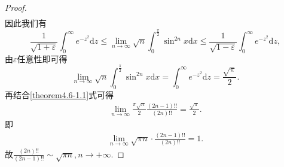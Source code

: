 \documentclass[../../main.tex]{subfiles}
\begin{document}
\begin{proof}
\begin{align*}
\end{align*}
因此我们有
\[
\frac{1}{\sqrt{1 + \varepsilon}}\int_{0}^{\infty}e^{-z^{2}}\mathrm{d}z\leqslant\lim_{n\rightarrow\infty}\sqrt{n}\int_{0}^{\frac{\pi}{2}}\sin^{2n}x \mathrm{d}x\leqslant\frac{1}{\sqrt{1 - \varepsilon}}\int_{0}^{\infty}e^{-z^{2}}\mathrm{d}z,
\]
由\(\varepsilon\)任意性即可得
\[
\lim_{n\rightarrow\infty}\sqrt{n}\int_{0}^{\frac{\pi}{2}}\sin^{2n}x \mathrm{d}x=\int_{0}^{\infty}e^{-z^{2}}\mathrm{d}z=\frac{\sqrt{\pi}}{2}.
\]
再结合\eqref{theorem4.6-1.1}式可得
\begin{align*}
\lim_{n\rightarrow \infty} \frac{\pi \sqrt{n}}{2}\frac{(2n-1)!!}{(2n)!!}=\frac{\sqrt{\pi}}{2}.
\end{align*}
即
\begin{align*}
\lim_{n\rightarrow \infty} \sqrt{\pi n}\cdot \frac{(2n-1)!!}{(2n)!!}=1.
\end{align*}
故$\frac{(2n)!!}{(2n-1)!!}\sim \sqrt{\pi n},n\rightarrow +\infty $.

\end{proof}
\end{document}
